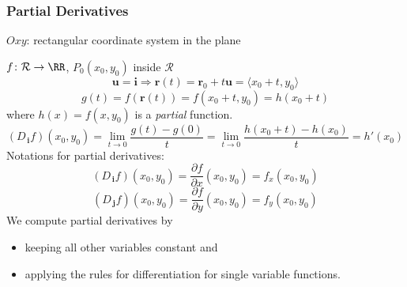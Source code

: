 \begin{frame}
  \frametitle{Partial Derivatives}

  $Oxy$: rectangular coordinate system in the plane

  $f\colon \mathcal{R} \to \RR$,  $P_0(x_0,y_0)$ inside $\mathcal{R}$
  $$\textbf{u}=\textbf{i} \Longrightarrow \textbf{r}(t) = \textbf{r}_0 + t\textbf{u} = \langle x_0+t, y_0 \rangle$$
  $$g(t) = f(\textbf{r}(t)) = f(x_0+t, y_0)= h(x_0+t)$$
  where $h(x) = f(x,y_0)$ is a \emph{partial} function.\pause
  $$(D_{\,\textbf{i}} f)(x_0,y_0) = \lim_{t\to 0} \frac{g(t)-g(0)}{t}
  =\lim_{t\to 0} \frac{h(x_0+t) -h(x_0)}{t} = h'(x_0)$$
\pause Notations for \textcolor[rgb]{0.98,0.00,0.00}{partial derivatives}:
%
$$(D_{\,\textbf{i}}f)(x_0,y_0) = \frac{\partial f}{\partial x}(x_0,y_0) =
f_x(x_0,y_0)$$
%
$$(D_{\,\textbf{j}}f)(x_0,y_0) =  \frac{\partial f}{\partial y}(x_0,y_0) =
f_y(x_0,y_0)$$
%
\pause We compute partial derivatives by
\begin{itemize}
  \item keeping all other variables constant and
  \item applying the rules for differentiation for single variable functions.
\end{itemize}
\end{frame}